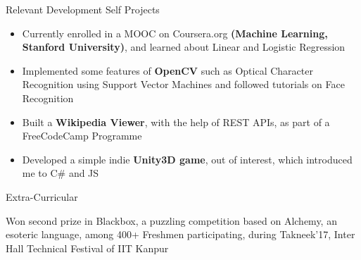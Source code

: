 \documentclass{resume} %
\begin{document}
\begin{rSection}{Relevant Development Self Projects}
\begin{itemize}
\item{Currently enrolled in a MOOC on Coursera.org \textbf{(Machine Learning, Stanford University)}, and learned about Linear and Logistic Regression}
\item{Implemented some features of \textbf{OpenCV} such as Optical Character Recognition using Support Vector Machines and followed tutorials on Face Recognition}
\item{Built a \textbf{Wikipedia Viewer}, with the help of REST APIs, as part of a FreeCodeCamp Programme}
\item{Developed a simple indie \textbf{Unity3D game}, out of interest, which introduced me to C\# and JS} 
\end{itemize}
\end{rSection}
\begin{rSection}{Extra-Curricular} \itemsep -3pt
\item Won second prize in Blackbox, a puzzling competition based on Alchemy, an esoteric language, among 400+ Freshmen participating, during Takneek'17, Inter Hall Technical Festival of IIT Kanpur
\end{rSection}
\end{document}
